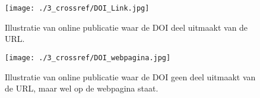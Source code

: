 \begin{figure}[h!]
    \centering
    \texttt{[image: ./3\_crossref/DOI\_Link.jpg]}
    \caption[Illustratie van online publicatie waar de DOI deel uitmaakt van de URL.]{\label{fig:DOIurl}Illustratie van online publicatie waar de DOI deel uitmaakt van de URL.}
\end{figure}
\begin{figure}[h!]
    \centering
    \texttt{[image: ./3\_crossref/DOI\_webpagina.jpg]}
    \caption[Illustratie van online publicatie waar de DOI geen deel uitmaakt van de URL, maar wel op de webpagina staat.]{\label{fig:DOIwebpagina}Illustratie van online publicatie waar de DOI geen deel uitmaakt van de URL, maar wel op de webpagina staat.}
\end{figure}

